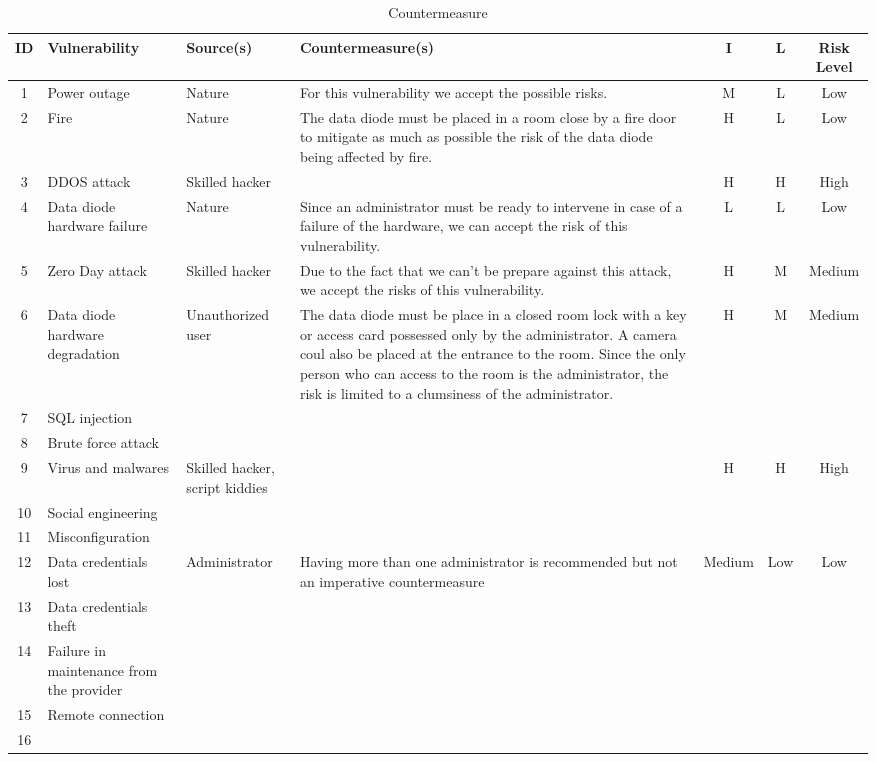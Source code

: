 \documentclass[a4paper,10pt]{article}
\begin{document}
\begin{table}[!h]
	\centering
	\begin{tabular}{|c|p{}|p{2.5cm}|p{6.5cm}|c|c|c|}
		\hline
		\textbf{ID}& \textbf{Vulnerability} & \textbf{Source(s)} & \textbf{Countermeasure(s)} & \textbf{I} & \textbf{L} & \textbf{Risk Level}          \\
		\hline
		1 & Power outage  & Nature & For this vulnerability we accept the possible risks. & M & L & Low \\
		\hline
		2 & Fire & Nature & The data diode must be placed in a room close by a fire door to mitigate as much as possible the risk of the data diode being affected by fire. & H & L & Low \\
		\hline
		3 & DDOS attack & Skilled hacker & & H & H & High \\
		\hline
		4 & Data diode hardware failure & Nature & Since an administrator must be ready to intervene in case of a failure of the hardware, we can accept the risk of this vulnerability. & L & L & Low \\
		\hline
		5 & Zero Day attack & Skilled hacker & Due to the fact that we can't be prepare against this attack, we accept the risks of this vulnerability. & H & M & Medium \\
		\hline
		6 & Data diode hardware degradation & Unauthorized user & The data diode must be place in a closed room lock with a key or access card possessed only by the administrator. A camera coul also be placed at the entrance to the room. Since the only person who can access to the room is the administrator, the risk is limited to a clumsiness of the administrator. & H & M & Medium  \\
		\hline
		7 &  SQL injection & & & & & \\
		\hline
		8 & Brute force attack & & & & & \\
		\hline
		9 & Virus and malwares & Skilled hacker, script kiddies & & H & H & High \\
		\hline
		10 & Social engineering & & & & & \\
		\hline
		11 & Misconfiguration & & & & & \\
		\hline
		12 & Data credentials lost & Administrator & Having more than one administrator is recommended but not an imperative countermeasure & Medium & Low & Low \\
		\hline
		13 &  Data credentials theft& & & & & \\
		\hline
		14 & Failure in maintenance from the provider& & & & & \\
		\hline
		15 & Remote connection & & & & & \\
		\hline
		16 & & & & & & \\
		\hline
		
	\end{tabular}
	\caption{Countermeasure}
\end{table}
\end{document}
